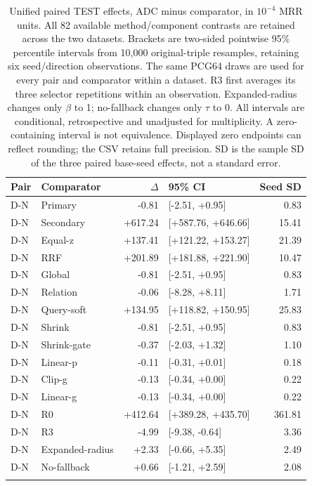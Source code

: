\begin{table}[htbp]
\centering\footnotesize\setlength{\tabcolsep}{3pt}
\caption{Unified paired TEST effects, ADC minus comparator, in $10^{-4}$ MRR units. All 82 available method/component contrasts are retained across the two datasets. Brackets are two-sided pointwise 95\% percentile intervals from 10,000 original-triple resamples, retaining six seed/direction observations. The same PCG64 draws are used for every pair and comparator within a dataset. R3 first averages its three selector repetitions within an observation. Expanded-radius changes only $\beta$ to 1; no-fallback changes only $\tau$ to 0. All intervals are conditional, retrospective and unadjusted for multiplicity. A zero-containing interval is not equivalence. Displayed zero endpoints can reflect rounding; the CSV retains full precision. SD is the sample SD of the three paired base-seed effects, not a standard error.}
\label{tab:query-paired-db15k}
\begin{tabular}{llrlr}
\toprule
Pair & Comparator & $\Delta$ & 95\% CI & Seed SD\\
\midrule
D-N & Primary & -0.81 & [-2.51, +0.95] & 0.83\\
D-N & Secondary & +617.24 & [+587.76, +646.66] & 15.41\\
D-N & Equal-z & +137.41 & [+121.22, +153.27] & 21.39\\
D-N & RRF & +201.89 & [+181.88, +221.90] & 10.47\\
D-N & Global & -0.81 & [-2.51, +0.95] & 0.83\\
D-N & Relation & -0.06 & [-8.28, +8.11] & 1.71\\
D-N & Query-soft & +134.95 & [+118.82, +150.95] & 25.83\\
D-N & Shrink & -0.81 & [-2.51, +0.95] & 0.83\\
D-N & Shrink-gate & -0.37 & [-2.03, +1.32] & 1.10\\
D-N & Linear-p & -0.11 & [-0.31, +0.01] & 0.18\\
D-N & Clip-g & -0.13 & [-0.34, +0.00] & 0.22\\
D-N & Linear-g & -0.13 & [-0.34, +0.00] & 0.22\\
D-N & R0 & +412.64 & [+389.28, +435.70] & 361.81\\
D-N & R3 & -4.99 & [-9.38, -0.64] & 3.36\\
D-N & Expanded-radius & +2.33 & [-0.66, +5.35] & 2.49\\
D-N & No-fallback & +0.66 & [-1.21, +2.59] & 2.08\\
\addlinespace

\end{tabular}
\end{table}
